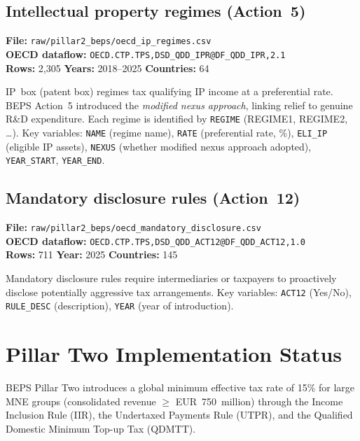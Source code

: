 \documentclass[11pt,a4paper]{article}
\newcommand{\code}[1]{\texttt{#1}}
\begin{document}
\subsection{Intellectual property regimes (Action~5)}

\textbf{File:} \texttt{raw/pillar2\_beps/oecd\_ip\_regimes.csv}\\
\textbf{OECD dataflow:} \texttt{OECD.CTP.TPS,DSD\_QDD\_IPR@DF\_QDD\_IPR,2.1}\\
\textbf{Rows:} 2{,}305 \quad \textbf{Years:} 2018--2025 \quad \textbf{Countries:} 64

IP~box (patent box) regimes tax qualifying IP income at a preferential rate.  BEPS Action~5 introduced the \emph{modified nexus approach}, linking relief to genuine R\&D expenditure.  Each regime is identified by \code{REGIME} (REGIME1, REGIME2, \ldots).  Key variables: \code{NAME} (regime name), \code{RATE} (preferential rate, \%), \code{ELI\_IP} (eligible IP assets), \code{NEXUS} (whether modified nexus approach adopted), \code{YEAR\_START}, \code{YEAR\_END}.

\subsection{Mandatory disclosure rules (Action~12)}

\textbf{File:} \texttt{raw/pillar2\_beps/oecd\_mandatory\_disclosure.csv}\\
\textbf{OECD dataflow:} \texttt{OECD.CTP.TPS,DSD\_QDD\_ACT12@DF\_QDD\_ACT12,1.0}\\
\textbf{Rows:} 711 \quad \textbf{Year:} 2025 \quad \textbf{Countries:} 145

Mandatory disclosure rules require intermediaries or taxpayers to proactively disclose potentially aggressive tax arrangements.  Key variables: \code{ACT12} (Yes/No), \code{RULE\_DESC} (description), \code{YEAR} (year of introduction).


\section{Pillar Two Implementation Status}\label{sec:pillar2}

BEPS Pillar Two introduces a global minimum effective tax rate of 15\% for
large MNE groups (consolidated revenue $\geq$ EUR~750~million) through
the Income Inclusion Rule (IIR), the Undertaxed Payments Rule (UTPR), and
the Qualified Domestic Minimum Top-up Tax (QDMTT).
\end{document}
